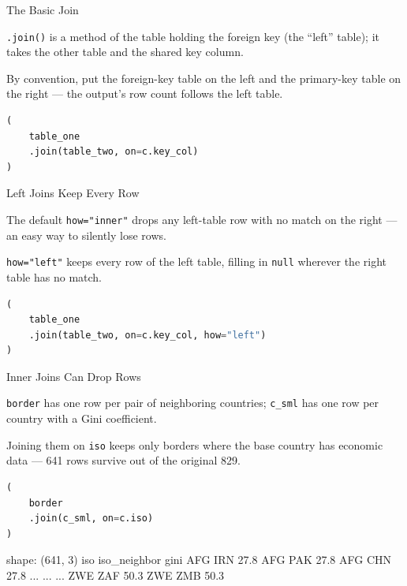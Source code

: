 \documentclass[8pt,aspectratio=169]{beamer}
\begin{document}
\begin{frame}[fragile]{The Basic Join}
\begin{splitcode}{%

\texttt{.join()} is a method of the table holding the foreign key (the ``left'' table); it takes the other table and the shared key column.

By convention, put the foreign-key table on the left and the primary-key table on the right --- the output's row count follows the left table.

}
\begin{lstlisting}[language=Python]
(
    table_one
    .join(table_two, on=c.key_col)
)
\end{lstlisting}
\end{splitcode}
\end{frame}

\begin{frame}[fragile]{Left Joins Keep Every Row}
\begin{splitcode}{%

The default \texttt{how="inner"} drops any left-table row with no match on the right --- an easy way to silently lose rows.

\texttt{how="left"} keeps every row of the left table, filling in \texttt{null} wherever the right table has no match.

}
\begin{lstlisting}[language=Python]
(
    table_one
    .join(table_two, on=c.key_col, how="left")
)
\end{lstlisting}
\end{splitcode}
\end{frame}

\begin{frame}[fragile]{Inner Joins Can Drop Rows}
\begin{splitcode}{%

\texttt{border} has one row per pair of neighboring countries; \texttt{c\_sml} has one row per country with a Gini coefficient.

Joining them on \texttt{iso} keeps only borders where the base country has economic data --- 641 rows survive out of the original 829.

}
\begin{lstlisting}[language=Python]
(
    border
    .join(c_sml, on=c.iso)
)
\end{lstlisting}
\begin{codeoutput}
shape: (641, 3)
iso  iso_neighbor  gini
AFG  IRN           27.8
AFG  PAK           27.8
AFG  CHN           27.8
...  ...           ...
ZWE  ZAF           50.3
ZWE  ZMB           50.3
\end{codeoutput}
\end{splitcode}
\end{frame}
\end{document}
